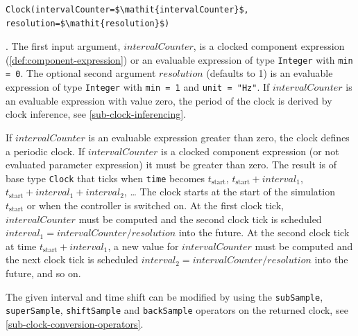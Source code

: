 \begin{operatordefinition*}[Clock]\label{modelica:clock-rational}
\begin{synopsis}\begin{lstlisting}
Clock(intervalCounter=$\mathit{intervalCounter}$, resolution=$\mathit{resolution}$)
\end{lstlisting}\end{synopsis}
\begin{semantics}
.
The first input argument, $\mathit{intervalCounter}$, is a clocked component expression (\cref{def:component-expression}) or an evaluable expression of type \lstinline!Integer! with \lstinline!min = 0!.
The optional second argument $\mathit{resolution}$ (defaults to 1) is an evaluable expression of type \lstinline!Integer! with \lstinline!min = 1! and \lstinline!unit = "Hz"!.
If $\mathit{intervalCounter}$ is an evaluable expression with value zero, the period of the clock is derived by clock inference, see \cref{sub-clock-inferencing}.

If $\mathit{intervalCounter}$ is an evaluable expression greater than zero, the clock defines a periodic clock.
If $\mathit{intervalCounter}$ is a clocked component expression (or not evaluated parameter expression) it must be greater than zero.
The result is of base type \lstinline!Clock! that ticks when \lstinline!time! becomes $t_{\mathrm{start}}$, $t_{\mathrm{start}} + \mathit{interval}_{1}$, $t_{\mathrm{start}} + \mathit{interval}_{1} + \mathit{interval}_{2}$, \@\ldots{}
The clock starts at the start of the simulation $t_{\mathrm{start}}$ or when the controller is switched on.
At the first clock tick, $\mathit{intervalCounter}$ must be computed and the second clock tick is scheduled $\mathit{interval}_{1} = \mathit{intervalCounter}/\mathit{resolution}$ into the future.
At the second clock tick at time $t_{\mathrm{start}} + \mathit{interval}_{1}$, a new value for $\mathit{intervalCounter}$ must be computed and the next clock tick is scheduled $\mathit{interval}_{2} = \mathit{intervalCounter}/\mathit{resolution}$ into the future, and so on.

\begin{nonnormative}
The given interval and time shift %
can be modified by using the \lstinline!subSample!, \lstinline!superSample!, \lstinline!shiftSample! and \lstinline!backSample! operators on the returned clock, see \cref{sub-clock-conversion-operators}.
\end{nonnormative}


\end{semantics}
\end{operatordefinition*}
